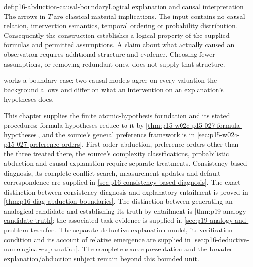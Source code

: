 \begin{hbwarning}{def:p16-abduction-causal-boundary}{Logical explanation and causal interpretation}
The arrows in \(T\) are classical material implications. The input
contains no causal relation, intervention semantics, temporal ordering or
probability distribution. Consequently the construction establishes a
logical property of the supplied formulas and permitted assumptions. A
claim about what actually caused an observation requires additional
structure and evidence. Choosing fewer assumptions, or removing redundant
ones, does not supply that structure.

 works a boundary case: two
causal models agree on every valuation the background allows and differ
on what an intervention on an explanation's hypotheses does.

This chapter supplies the finite atomic-hypothesis foundation and its stated
procedures; formula hypotheses reduce to it by
\cref{thm:p15-w02c-p15-027-formula-hypotheses}, and the source's
general preference framework is in
\cref{sec:p15-w02c-p15-027-preference-orders}. First-order
abduction, preference orders other than the three treated there, the
source's complexity classifications,
probabilistic abduction and causal explanation require separate treatments.
Consistency-based diagnosis, its complete conflict search, measurement
updates and default correspondence are supplied in
\cref{sec:p16-consistency-based-diagnosis}.
The exact distinction between consistency diagnosis and explanatory
entailment is proved in \cref{thm:p16-diag-abduction-boundaries}.
The distinction between generating an analogical candidate and
establishing its truth by entailment is
\cref{thm:p19-analogy-candidate-truth}; the associated task evidence
is supplied in \cref{sec:p19-analogy-and-problem-transfer}.
The separate deductive-explanation model, its verification
condition and its account of relative emergence are supplied in
\cref{sec:p16-deductive-nomological-explanation}.
The complete source
presentation and the broader explanation/abduction subject remain beyond
this bounded unit.
\end{hbwarning}

